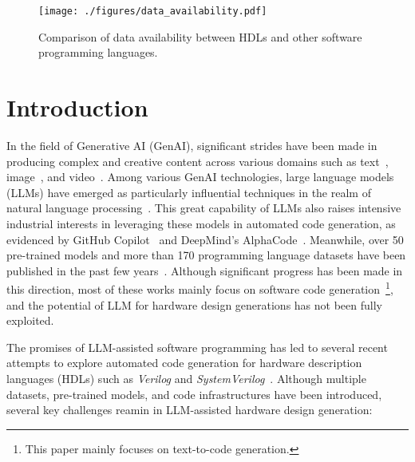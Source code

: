 \begin{figure}[t]
\centering
\texttt{[image: ./figures/data\_availability.pdf]}
\vspace{-7mm}
\caption{Comparison of data availability between HDLs and other software programming languages.}
\vspace{-5mm}
\label{fig:comp_data_avail}
\end{figure}


\section{Introduction}

In the field of Generative AI (GenAI), significant strides have been made in producing complex and creative content across various domains such as text~\cite{brown2020language}, image~\cite{avrahami2022blended,saharia2022image}, and video~\cite{opensora}. 
Among various GenAI technologies, large language models (LLMs) have emerged as particularly influential techniques in the realm of natural language processing~\cite{zhao2023survey}. 
This great capability of LLMs also raises intensive industrial interests in leveraging these models in automated code generation, as evidenced by GitHub Copilot~\cite{chen2021evaluating} and DeepMind’s AlphaCode~\cite{li2022competition}.
Meanwhile, over 50 pre-trained models and more than 170 programming language datasets have been published in the past few years~\cite{zhang2023unifying}.
Although significant progress has been made in this direction, most of these works mainly focus on software code generation~\footnote{This paper mainly focuses on text-to-code generation.}, and the potential of LLM for hardware design generations has not been fully exploited.


The promises of LLM-assisted software programming has led to several recent attempts to explore automated code generation for hardware description languages (HDLs) such as \textit{Verilog} and \textit{SystemVerilog}~\cite{li2023starcoder, lu2024rtllm, liu2023verilogeval, thakur2023verigen}.
Although multiple datasets, pre-trained models, and code infrastructures have been introduced, several key challenges reamin in LLM-assisted hardware design generation: 

